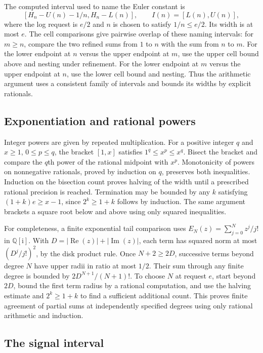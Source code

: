 \documentclass[11pt]{amsart}
\theoremstyle{definition}
\theoremstyle{remark}
\numberwithin{equation}{section}
\newcommand{\QQi}{\mathbb Q[\mathrm i]}
\newcommand{\ip}[2]{[#1,#2]}
\newcommand{\re}{\operatorname{Re}}
\newcommand{\im}{\operatorname{Im}}
\begin{document}
The computed interval used to name the Euler constant is
\[
 \ip{H_n-U(n)-1/n}{H_n-L(n)},\qquad
 I(n)=[L(n),U(n)],
\]
where the log request is $e/2$ and $n$ is chosen to satisfy
$1/n\le e/2$. Its width is at most $e$. The cell comparisons give
pairwise overlap of these naming intervals: for $m\ge n$, compare
the two refined sums from $1$ to $n$ with the sum from $n$ to $m$.
For the lower endpoint at $n$ versus the upper endpoint at $m$,
use the upper cell bound above and nesting under refinement. For the
lower endpoint at $m$ versus the upper endpoint at $n$, use the lower
cell bound and nesting. Thus the arithmetic argument uses a consistent
family of intervals and bounds its widths by explicit rationals.

\subsection{Exponentiation and rational powers}
\label{sec:finite-exp}

Integer powers are given by repeated multiplication. For a positive
integer $q$ and $x\ge1$, $0\le p\le q$, the bracket $[1,x]$ satisfies
$1^q\le x^p\le x^q$. Bisect the bracket and compare the $q$th power of
the rational midpoint with $x^p$. Monotonicity of powers on nonnegative
rationals, proved by induction on $q$, preserves both inequalities.
Induction on the bisection count proves halving of the width until
a prescribed rational precision is reached. Termination may be
bounded by any $k$ satisfying $(1+k)e\ge x-1$, since
$2^k\ge1+k$ follows by induction. The same argument brackets a square
root below and above using only squared inequalities.

For completeness, a finite exponential tail comparison uses
$E_N(z)=\sum_{j=0}^N z^j/j!$ in $\QQi$. With
$D=|\re(z)|+|\im(z)|$, each term has squared norm at most
$(D^j/j!)^2$, by the disk product rule. Once $N+2\ge2D$, successive
terms beyond degree $N$ have upper radii in ratio at most $1/2$.
Their sum through any finite degree is bounded by $2D^{N+1}/(N+1)!$.
To choose $N$ at request $e$, start beyond $2D$, bound the first
term radius by a rational computation, and use the halving estimate
and $2^k\ge1+k$ to find a sufficient additional count.
This proves finite agreement of partial sums at independently
specified degrees using only rational arithmetic and induction.

\subsection{The signal interval}
\end{document}
